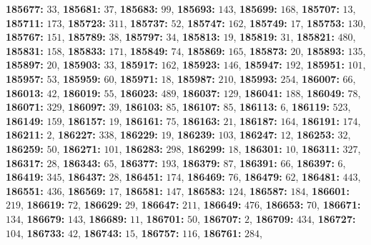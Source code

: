 \textsf{\bfseries 185677:} $33$, \textsf{\bfseries 185681:} $37$, \textsf{\bfseries 185683:} $99$, \textsf{\bfseries 185693:} $143$, \textsf{\bfseries 185699:} $168$, \textsf{\bfseries 185707:} $13$, \textsf{\bfseries 185711:} $173$, \textsf{\bfseries 185723:} $311$, \textsf{\bfseries 185737:} $52$, \textsf{\bfseries 185747:} $162$, \textsf{\bfseries 185749:} $17$, \textsf{\bfseries 185753:} $130$, \textsf{\bfseries 185767:} $151$, \textsf{\bfseries 185789:} $38$, \textsf{\bfseries 185797:} $34$, \textsf{\bfseries 185813:} $19$, \textsf{\bfseries 185819:} $31$, \textsf{\bfseries 185821:} $480$, \textsf{\bfseries 185831:} $158$, \textsf{\bfseries 185833:} $171$, \textsf{\bfseries 185849:} $74$, \textsf{\bfseries 185869:} $165$, \textsf{\bfseries 185873:} $20$, \textsf{\bfseries 185893:} $135$, \textsf{\bfseries 185897:} $20$, \textsf{\bfseries 185903:} $33$, \textsf{\bfseries 185917:} $162$, \textsf{\bfseries 185923:} $146$, \textsf{\bfseries 185947:} $192$, \textsf{\bfseries 185951:} $101$, \textsf{\bfseries 185957:} $53$, \textsf{\bfseries 185959:} $60$, \textsf{\bfseries 185971:} $18$, \textsf{\bfseries 185987:} $210$, \textsf{\bfseries 185993:} $254$, \textsf{\bfseries 186007:} $66$, \textsf{\bfseries 186013:} $42$, \textsf{\bfseries 186019:} $55$, \textsf{\bfseries 186023:} $489$, \textsf{\bfseries 186037:} $129$, \textsf{\bfseries 186041:} $188$, \textsf{\bfseries 186049:} $78$, \textsf{\bfseries 186071:} $329$, \textsf{\bfseries 186097:} $39$, \textsf{\bfseries 186103:} $85$, \textsf{\bfseries 186107:} $85$, \textsf{\bfseries 186113:} $6$, \textsf{\bfseries 186119:} $523$, \textsf{\bfseries 186149:} $159$, \textsf{\bfseries 186157:} $19$, \textsf{\bfseries 186161:} $75$, \textsf{\bfseries 186163:} $21$, \textsf{\bfseries 186187:} $164$, \textsf{\bfseries 186191:} $174$, \textsf{\bfseries 186211:} $2$, \textsf{\bfseries 186227:} $338$, \textsf{\bfseries 186229:} $19$, \textsf{\bfseries 186239:} $103$, \textsf{\bfseries 186247:} $12$, \textsf{\bfseries 186253:} $32$, \textsf{\bfseries 186259:} $50$, \textsf{\bfseries 186271:} $101$, \textsf{\bfseries 186283:} $298$, \textsf{\bfseries 186299:} $18$, \textsf{\bfseries 186301:} $10$, \textsf{\bfseries 186311:} $327$, \textsf{\bfseries 186317:} $28$, \textsf{\bfseries 186343:} $65$, \textsf{\bfseries 186377:} $193$, \textsf{\bfseries 186379:} $87$, \textsf{\bfseries 186391:} $66$, \textsf{\bfseries 186397:} $6$, \textsf{\bfseries 186419:} $345$, \textsf{\bfseries 186437:} $28$, \textsf{\bfseries 186451:} $174$, \textsf{\bfseries 186469:} $76$, \textsf{\bfseries 186479:} $62$, \textsf{\bfseries 186481:} $443$, \textsf{\bfseries 186551:} $436$, \textsf{\bfseries 186569:} $17$, \textsf{\bfseries 186581:} $147$, \textsf{\bfseries 186583:} $124$, \textsf{\bfseries 186587:} $184$, \textsf{\bfseries 186601:} $219$, \textsf{\bfseries 186619:} $72$, \textsf{\bfseries 186629:} $29$, \textsf{\bfseries 186647:} $211$, \textsf{\bfseries 186649:} $476$, \textsf{\bfseries 186653:} $70$, \textsf{\bfseries 186671:} $134$, \textsf{\bfseries 186679:} $143$, \textsf{\bfseries 186689:} $11$, \textsf{\bfseries 186701:} $50$, \textsf{\bfseries 186707:} $2$, \textsf{\bfseries 186709:} $434$, \textsf{\bfseries 186727:} $104$, \textsf{\bfseries 186733:} $42$, \textsf{\bfseries 186743:} $15$, \textsf{\bfseries 186757:} $116$, \textsf{\bfseries 186761:} $284$, 
